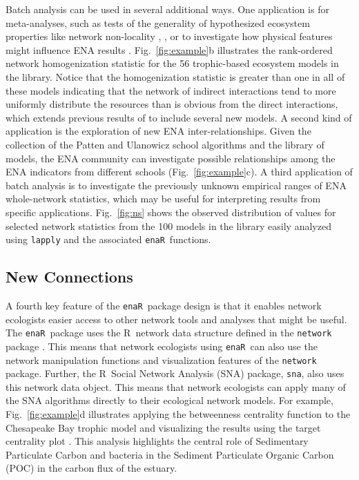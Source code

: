 \documentclass[11pt]{article}
\newcommand{\R}{R}
\newcommand{\enaR}{\texttt{enaR}}
\begin{document}
\begin{spacing}{2}
Batch analysis can be used in several additional ways.  One
application is for meta-analyses, such as tests of the generality of
hypothesized ecosystem properties like network non-locality
\citep{salas11_did}, %
\citep{borrett10_hmg}, or to investigate how physical features might
influence ENA results
\citep{niquil2012physical}. Fig.~\ref{fig:example}b illustrates the
rank-ordered network homogenization statistic for the 56 trophic-based
ecosystem models in the library. Notice that the homogenization
statistic is greater than one in all of these models indicating that
the network of indirect interactions tend to more uniformly distribute
the resources than is obvious from the direct interactions, which
extends previous results of \citet{borrett10_hmg} to include several
new models.  A second kind of application is the exploration of new
ENA inter-relationships.  Given the collection of the Patten and
Ulanowicz school algorithms and the library of models, the ENA
community can investigate possible relationships among the ENA
indicators from different schools (Fig.~\ref{fig:example}c).  A third
application of batch analysis is to investigate the previously unknown
empirical ranges of ENA whole-network statistics, which may be useful
for interpreting results from specific applications.
Fig.~\ref{fig:ns} shows the observed distribution of values for
selected network statistics from the 100 models in the library easily
analyzed using \texttt{lapply} and the associated \enaR\ functions.

\subsection{New Connections}
A fourth key feature of the \enaR\ package design is that it enables
network ecologists easier access to other network tools and analyses
that might be useful.  The \enaR\ package uses the \R\ network data
structure defined in the \texttt{network} package
\citep{butts08_network}.  This means that network ecologists using \enaR\
can also use the network manipulation functions and visualization
features of the \texttt{network} package. Further, the \R\ Social
Network Analysis (SNA) package, \texttt{sna}, \citep{butts08_social} also uses this
network data object.  This means that network ecologists can apply
many of the SNA algorithms directly to their ecological network
models.  For example, Fig.~\ref{fig:example}d illustrates applying the betweenness
centrality function to the Chesapeake Bay trophic model
\citep{baird89} and visualizing the results using the target
centrality plot \citep{brandes03}.  This analysis highlights the
central role of Sedimentary Particulate Carbon and bacteria in the
Sediment Particulate Organic Carbon (POC) in the carbon flux of the
estuary.


\end{spacing}
\end{document}
